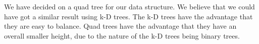 We have decided on a quad tree for our data structure. We believe that we could have got a similar result using k-D trees. The k-D trees have the advantage that they are easy to balance. Quad trees have the advantage that they have an overall smaller height, due to the nature of the k-D trees being binary trees.